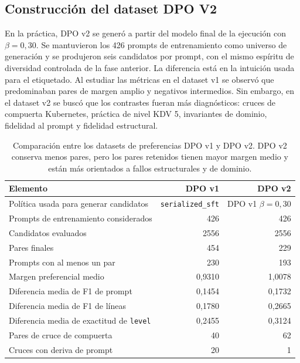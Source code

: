 \subsection{Construcción del dataset DPO V2}

En la práctica, DPO v2 se generó a partir del modelo final de la ejecución con \(\beta=0{,}30\). 
Se mantuvieron los 426 prompts de entrenamiento como universo de generación y se
produjeron seis candidatos por prompt, con el mismo espíritu de diversidad controlada de la fase
anterior. La diferencia está en la intuición usada para el etiquetado. Al estudiar las métricas en el dataset
v1 se observó que predominaban pares de margen amplio y negativos
intermedios. Sin embargo, en el dataset v2 se buscó que los contrastes fueran más diagnósticos: cruces de compuerta
Kubernetes, práctica de nivel KDV 5, invariantes de dominio, fidelidad al prompt y fidelidad
estructural.

\begin{table}[htbp]
\centering
\caption{Comparación entre los datasets de preferencias DPO v1 y DPO v2. DPO v2 conserva menos pares,
         pero los pares retenidos tienen mayor margen medio y están más orientados a fallos
         estructurales y de dominio.}
\label{tab:ch7_dpo_v1_v2_dataset_summary}
\small
\begin{tabularx}{\textwidth}{Xrr}
\toprule
\textbf{Elemento} & \textbf{DPO v1} & \textbf{DPO v2} \\
\midrule
Política usada para generar candidatos & \texttt{serialized\_sft} & DPO v1 \(\beta=0{,}30\) \\
Prompts de entrenamiento considerados & 426 & 426 \\
Candidatos evaluados & 2556 & 2556 \\
Pares finales & 454 & 229 \\
Prompts con al menos un par & 230 & 193 \\
Margen preferencial medio & 0,9310 & 1,0078 \\
Diferencia media de F1 de prompt & 0,1454 & 0,1732 \\
Diferencia media de F1 de líneas & 0,1780 & 0,2665 \\
Diferencia media de exactitud de \texttt{level} & 0,2455 & 0,3124 \\
Pares de cruce de compuerta & 40 & 62 \\
Cruces con deriva de prompt & 20 & 1 \\
\bottomrule
\end{tabularx}
\end{table}

